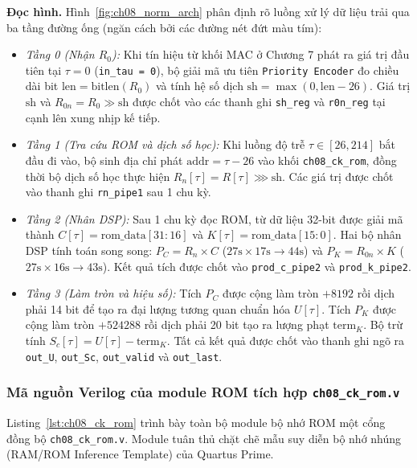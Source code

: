\textbf{Đọc hình.} Hình~\ref{fig:ch08_norm_arch} phân định rõ luồng xử lý dữ liệu trải qua ba tầng đường ống (ngăn cách bởi các đường nét đứt màu tím):
\begin{itemize}[leftmargin=1.5em, itemsep=2pt]
    \item \emph{Tầng 0 (Nhận $R_0$):} Khi tín hiệu từ khối MAC ở Chương 7 phát ra giá trị đầu tiên tại $\tau = 0$ (\texttt{in\_tau = 0}), bộ giải mã ưu tiên \texttt{Priority Encoder} đo chiều dài bit $\text{len} = \text{bitlen}(R_0)$ và tính hệ số dịch $\text{sh} = \max(0, \text{len} - 26)$. Giá trị $\text{sh}$ và $R_{0n} = R_0 \gg \text{sh}$ được chốt vào các thanh ghi \texttt{sh\_reg} và \texttt{r0n\_reg} tại cạnh lên xung nhịp kế tiếp.
    \item \emph{Tầng 1 (Tra cứu ROM và dịch số học):} Khi luồng độ trễ $\tau \in [26, 214]$ bắt đầu đi vào, bộ sinh địa chỉ phát $\text{addr} = \tau - 26$ vào khối \texttt{ch08\_ck\_rom}, đồng thời bộ dịch số học thực hiện $R_n[\tau] = R[\tau] \ggg \text{sh}$. Các giá trị được chốt vào thanh ghi \texttt{rn\_pipe1} sau 1 chu kỳ.
    \item \emph{Tầng 2 (Nhân DSP):} Sau 1 chu kỳ đọc ROM, từ dữ liệu 32-bit được giải mã thành $C[\tau] = \text{rom\_data}[31:16]$ và $K[\tau] = \text{rom\_data}[15:0]$. Hai bộ nhân DSP tính toán song song: $P_C = R_n \times C$ ($27\text{s} \times 17\text{s} \to 44\text{s}$) và $P_K = R_{0n} \times K$ ($27\text{s} \times 16\text{s} \to 43\text{s}$). Kết quả tích được chốt vào \texttt{prod\_c\_pipe2} và \texttt{prod\_k\_pipe2}.
    \item \emph{Tầng 3 (Làm tròn và hiệu số):} Tích $P_C$ được cộng làm tròn $+ 8192$ rồi dịch phải 14 bit để tạo ra đại lượng tương quan chuẩn hóa $U[\tau]$. Tích $P_K$ được cộng làm tròn $+ 524288$ rồi dịch phải 20 bit tạo ra lượng phạt $\text{term}_K$. Bộ trừ tính $S_c[\tau] = U[\tau] - \text{term}_K$. Tất cả kết quả được chốt vào thanh ghi ngõ ra \texttt{out\_U}, \texttt{out\_Sc}, \texttt{out\_valid} và \texttt{out\_last}.
\end{itemize}

\subsubsection*{Mã nguồn Verilog của module ROM tích hợp \texttt{ch08\_ck\_rom.v}}
Listing~\ref{lst:ch08_ck_rom} trình bày toàn bộ module bộ nhớ ROM một cổng đồng bộ \texttt{ch08\_ck\_rom.v}. Module tuân thủ chặt chẽ mẫu suy diễn bộ nhớ nhúng (RAM/ROM Inference Template) của Quartus Prime.

